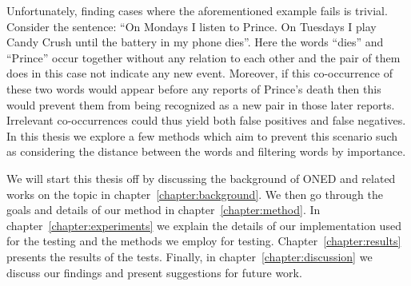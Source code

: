 Unfortunately, finding cases where the aforementioned example fails is trivial. Consider the sentence: ``On Mondays I listen to Prince. On Tuesdays I play Candy Crush until the battery in my phone dies''. Here the words ``dies'' and ``Prince'' occur together without any relation to each other and the pair of them does in this case not indicate any new event. Moreover, if this co-occurrence of these two words would appear before any reports of Prince's death then this would prevent them from being recognized as a new pair in those later reports. Irrelevant co-occurrences could thus yield both false positives and false negatives. In this thesis we explore a few methods which aim to prevent this scenario such as considering the distance between the words and filtering words by importance.

We will start this thesis off by discussing the background of ONED and related works on the topic in chapter~\ref{chapter:background}. We then go through the goals and details of our method in chapter~\ref{chapter:method}. In chapter~\ref{chapter:experiments} we explain the details of our implementation used for the testing and the methods we employ for testing. Chapter~\ref{chapter:results} presents the results of the tests. Finally, in chapter~\ref{chapter:discussion} we discuss our findings and present suggestions for future work.
